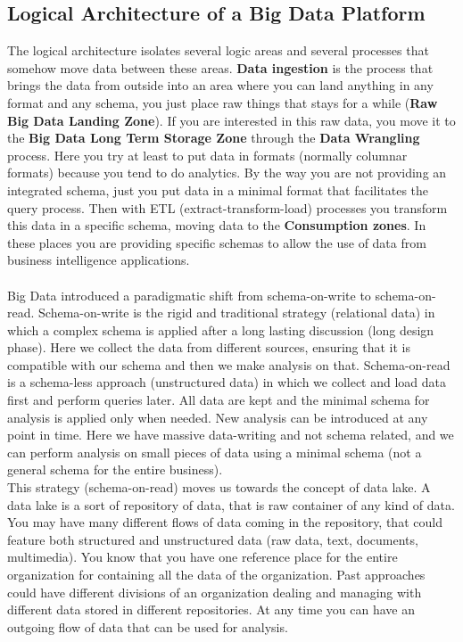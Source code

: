 \documentclass[10pt,a4paper]{article}
\newcommand{\nline}{\\~\\}
\begin{document}
 \subsection{Logical Architecture of a Big Data Platform}
 The logical architecture isolates several logic areas and several processes that somehow move data between these areas. \textbf{Data ingestion} is the process that brings the data from outside into an area where you can land anything in any format and any schema, you just place raw things that stays for a while (\textbf{Raw Big Data Landing Zone}). If you are interested in this raw data, you move it to the \textbf{Big Data Long Term Storage Zone} through the \textbf{Data Wrangling} process. Here you try at least to put data in formats (normally columnar formats) because you tend to do analytics. By the way you are not providing an integrated schema, just you put data in a minimal format that facilitates the query process. Then with ETL (extract-transform-load) processes you transform this data in a specific schema, moving data to the \textbf{Consumption zones}. In these places you are providing specific schemas to allow the use of data from business intelligence applications.
\nline
Big Data introduced a paradigmatic shift from schema-on-write to schema-on-read. 
Schema-on-write is the rigid and traditional strategy (relational data) in which a complex schema is applied after a long lasting discussion (long design phase). Here we collect the data from different sources, ensuring that it is compatible with our schema and then we make analysis on that.
Schema-on-read is a schema-less approach (unstructured data) in which we collect and load data first and perform queries later. All data are kept and the minimal schema for analysis is applied only when needed. New analysis can be introduced at any point in time. Here we have massive data-writing and not schema related, and we can perform analysis on small pieces of data using a minimal schema (not a general schema for the entire business). \\
This strategy (schema-on-read) moves us towards the concept of data lake. A data lake is a sort of repository of data, that is raw container of any kind of data. You may have many different flows of data coming in the repository, that could feature both structured and unstructured data (raw data, text, documents, multimedia). You know that you have one reference place for the entire organization for containing all the data of the organization. Past approaches could have different divisions of an organization dealing and managing with different data stored in different repositories. At any time you can have an outgoing flow of data that can be used for analysis. \\
\end{document}
